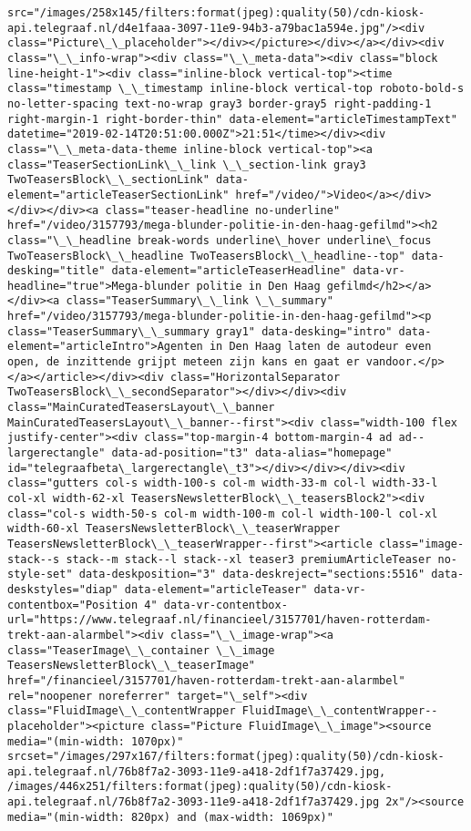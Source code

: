 \documentclass[11pt]{article}
\begin{document}
\begin{Verbatim}[commandchars=\\\{\}]
src="/images/258x145/filters:format(jpeg):quality(50)/cdn-kiosk-api.telegraaf.nl/d4e1faaa-3097-11e9-94b3-a79bac1a594e.jpg"/><div class="Picture\_\_placeholder"></div></picture></div></a></div><div class="\_\_info-wrap"><div class="\_\_meta-data"><div class="block line-height-1"><div class="inline-block vertical-top"><time class="timestamp \_\_timestamp inline-block vertical-top roboto-bold-s no-letter-spacing text-no-wrap gray3 border-gray5 right-padding-1 right-margin-1 right-border-thin" data-element="articleTimestampText" datetime="2019-02-14T20:51:00.000Z">21:51</time></div><div class="\_\_meta-data-theme inline-block vertical-top"><a class="TeaserSectionLink\_\_link \_\_section-link gray3 TwoTeasersBlock\_\_sectionLink" data-element="articleTeaserSectionLink" href="/video/">Video</a></div></div></div><a class="teaser-headline no-underline" href="/video/3157793/mega-blunder-politie-in-den-haag-gefilmd"><h2 class="\_\_headline break-words underline\_hover underline\_focus TwoTeasersBlock\_\_headline TwoTeasersBlock\_\_headline--top" data-desking="title" data-element="articleTeaserHeadline" data-vr-headline="true">Mega-blunder politie in Den Haag gefilmd</h2></a></div><a class="TeaserSummary\_\_link \_\_summary" href="/video/3157793/mega-blunder-politie-in-den-haag-gefilmd"><p class="TeaserSummary\_\_summary gray1" data-desking="intro" data-element="articleIntro">Agenten in Den Haag laten de autodeur even open, de inzittende grijpt meteen zijn kans en gaat er vandoor.</p></a></article></div><div class="HorizontalSeparator TwoTeasersBlock\_\_secondSeparator"></div></div><div class="MainCuratedTeasersLayout\_\_banner MainCuratedTeasersLayout\_\_banner--first"><div class="width-100 flex justify-center"><div class="top-margin-4 bottom-margin-4 ad ad--largerectangle" data-ad-position="t3" data-alias="homepage" id="telegraafbeta\_largerectangle\_t3"></div></div></div><div class="gutters col-s width-100-s col-m width-33-m col-l width-33-l col-xl width-62-xl TeasersNewsletterBlock\_\_teasersBlock2"><div class="col-s width-50-s col-m width-100-m col-l width-100-l col-xl width-60-xl TeasersNewsletterBlock\_\_teaserWrapper TeasersNewsletterBlock\_\_teaserWrapper--first"><article class="image-stack--s stack--m stack--l stack--xl teaser3 premiumArticleTeaser no-style-set" data-deskposition="3" data-deskreject="sections:5516" data-deskstyles="diap" data-element="articleTeaser" data-vr-contentbox="Position 4" data-vr-contentbox-url="https://www.telegraaf.nl/financieel/3157701/haven-rotterdam-trekt-aan-alarmbel"><div class="\_\_image-wrap"><a class="TeaserImage\_\_container \_\_image TeasersNewsletterBlock\_\_teaserImage" href="/financieel/3157701/haven-rotterdam-trekt-aan-alarmbel" rel="noopener noreferrer" target="\_self"><div class="FluidImage\_\_contentWrapper FluidImage\_\_contentWrapper--placeholder"><picture class="Picture FluidImage\_\_image"><source media="(min-width: 1070px)" srcset="/images/297x167/filters:format(jpeg):quality(50)/cdn-kiosk-api.telegraaf.nl/76b8f7a2-3093-11e9-a418-2df1f7a37429.jpg, /images/446x251/filters:format(jpeg):quality(50)/cdn-kiosk-api.telegraaf.nl/76b8f7a2-3093-11e9-a418-2df1f7a37429.jpg 2x"/><source media="(min-width: 820px) and (max-width: 1069px)" 
\end{Verbatim}
\end{document}
